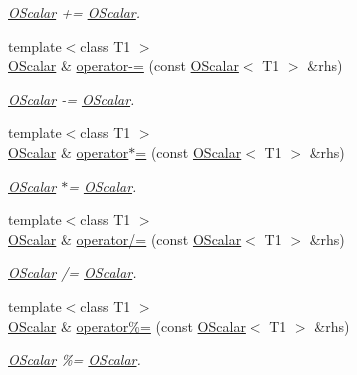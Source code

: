 \begin{DoxyCompactItemize}
\begin{DoxyCompactList}\small\item\em \mbox{\hyperlink{classENSEM_1_1OScalar}{O\+Scalar}} += \mbox{\hyperlink{classENSEM_1_1OScalar}{O\+Scalar}}. \end{DoxyCompactList}\item 
{\footnotesize template$<$class T1 $>$ }\\\mbox{\hyperlink{classENSEM_1_1OScalar}{O\+Scalar}} \& \mbox{\hyperlink{classENSEM_1_1OScalar_a4d240e95768b5a0c9537b32d00d60ac5}{operator-\/=}} (const \mbox{\hyperlink{classENSEM_1_1OScalar}{O\+Scalar}}$<$ T1 $>$ \&rhs)
\begin{DoxyCompactList}\small\item\em \mbox{\hyperlink{classENSEM_1_1OScalar}{O\+Scalar}} -\/= \mbox{\hyperlink{classENSEM_1_1OScalar}{O\+Scalar}}. \end{DoxyCompactList}\item 
{\footnotesize template$<$class T1 $>$ }\\\mbox{\hyperlink{classENSEM_1_1OScalar}{O\+Scalar}} \& \mbox{\hyperlink{classENSEM_1_1OScalar_a9977cd15ef5da689d65713ddf0768085}{operator$\ast$=}} (const \mbox{\hyperlink{classENSEM_1_1OScalar}{O\+Scalar}}$<$ T1 $>$ \&rhs)
\begin{DoxyCompactList}\small\item\em \mbox{\hyperlink{classENSEM_1_1OScalar}{O\+Scalar}} $\ast$= \mbox{\hyperlink{classENSEM_1_1OScalar}{O\+Scalar}}. \end{DoxyCompactList}\item 
{\footnotesize template$<$class T1 $>$ }\\\mbox{\hyperlink{classENSEM_1_1OScalar}{O\+Scalar}} \& \mbox{\hyperlink{classENSEM_1_1OScalar_a1e0517e29754a8acb284c3ac266c2b2c}{operator/=}} (const \mbox{\hyperlink{classENSEM_1_1OScalar}{O\+Scalar}}$<$ T1 $>$ \&rhs)
\begin{DoxyCompactList}\small\item\em \mbox{\hyperlink{classENSEM_1_1OScalar}{O\+Scalar}} /= \mbox{\hyperlink{classENSEM_1_1OScalar}{O\+Scalar}}. \end{DoxyCompactList}\item 
{\footnotesize template$<$class T1 $>$ }\\\mbox{\hyperlink{classENSEM_1_1OScalar}{O\+Scalar}} \& \mbox{\hyperlink{classENSEM_1_1OScalar_a89a76b1229e185250c0b9c48ae13d98b}{operator\%=}} (const \mbox{\hyperlink{classENSEM_1_1OScalar}{O\+Scalar}}$<$ T1 $>$ \&rhs)
\begin{DoxyCompactList}\small\item\em \mbox{\hyperlink{classENSEM_1_1OScalar}{O\+Scalar}} \%= \mbox{\hyperlink{classENSEM_1_1OScalar}{O\+Scalar}}. \end{DoxyCompactList}\item 

\end{DoxyCompactItemize}
